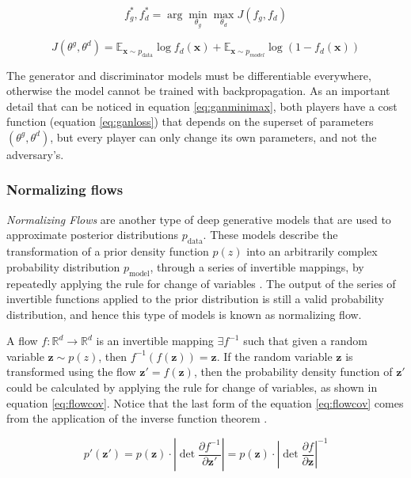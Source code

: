 \begin{equation}
	\label{eq:ganminimax}
	f_g^*, f_d^* = \arg \min_{\theta_g} \max_{\theta_d} J(f_g, f_d)
\end{equation}

\begin{equation}
	\label{eq:ganloss}
	J(\theta^g, \theta^d) = \mathbb{E}_{\mathbf{x}\sim p_\mathrm{data}} \log f_d(\mathbf{x}) + \mathbb{E}_{\mathbf{x}\sim p_{model}} \log (1 - f_d(\mathbf{x}))
\end{equation}

The generator and discriminator models must be differentiable everywhere, otherwise the model cannot be trained with backpropagation. As an important detail that can be noticed in equation \ref{eq:ganminimax}, both players have a cost function (equation \ref{eq:ganloss}) that depends on the superset  of parameters $(\theta^g, \theta^d)$, but every player can only change its own parameters, and not the adversary's.



\subsubsection{Normalizing flows}
\textit{Normalizing Flows} are another type of deep generative models that are used to approximate posterior distributions $p_\mathrm{data}$. These models describe the transformation of a prior density function $p(z)$ into an arbitrarily complex probability distribution $p_\mathrm{model}$, through a series of invertible mappings, by repeatedly applying the rule for change of variables \autocite{rezende2015}. The output of the series of invertible functions applied to the prior distribution is still a valid probability distribution, and hence this type of models is known as normalizing flow.

A flow $f: \mathbb{R}^d \rightarrow \mathbb{R}^d$ is an invertible mapping $\exists f^{-1}$ such that given a random variable $\mathbf{z} \sim p(z)$, then $f^{-1}(f(\mathbf{z})) = \mathbf{z}$. If the random variable $\mathbf{z}$ is transformed using the flow $\mathbf{z'} = f(\mathbf{z})$, then the probability density function of $\mathbf{z'}$ could be calculated by applying the rule for change of variables, as shown in equation \ref{eq:flowcov}. Notice that the last form of the  equation \ref{eq:flowcov} comes from the application of the inverse function theorem \autocite{rezende2015}.

\begin{equation}
\label{eq:flowcov}
p'(\mathbf{z'}) = p(\mathbf{z}) \cdot \left| \det \frac{\partial f^{-1}}{\partial \mathbf{z'}} \right| = p(\mathbf{z}) \cdot \left| \det \frac{\partial f}{\partial \mathbf{z}} \right|^{-1}
\end{equation}

